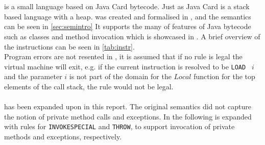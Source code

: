 \section{\jcl}
\jcl is a small language based on Java Card bytecode. Just as Java Card \jcl is a stack based language with a heap. \jcl was created and formalised in \cite{javasec}, and the semantics can be seen in \cref{sec:semintro}
It supports the many of features of Java bytecode such as classes and method invocation which is showcased in . 
A brief overview of the instructions can be seen in \cref{tab:instr}.\\

\noindent Program errors are not resented in \jcl, it is assumed that if no rule is legal the virtual machine will exit, e.g. if the current instruction is resolved to be \texttt{LOAD } $i$ and the parameter $i$ is not part of the domain for the $Local$ function for the top elements of the call stack, the rule would not be legal. \\\\
\jcl has been expanded upon in this report. 
The original semantics did not capture the notion of private method calls and exceptions. 
In the following \jcl is expanded with rules for \texttt{INVOKESPECIAL} and \texttt{THROW}, to support invocation of private methods and exceptions, respectively.

